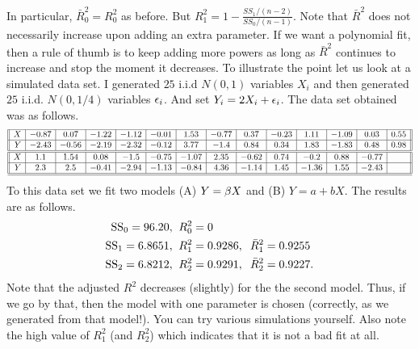 \documentclass[preprint,  11pt]{amsart}
\begin{document}
In particular, $\bar{R}_{0}^{2}=R_{0}^{2}$ as before. But $R_{1}^{2}=1-\frac{SS_{1}/(n-2)}{SS_{0}/(n-1)}$. Note that $\bar{R}^{2}$ does not necessarily increase upon adding an extra parameter. If we want a polynomial fit, then a rule of thumb is to keep adding more powers as long as $\bar{R}^{2}$ continues to increase and stop the moment it decreases.
\beg To illustrate the point let us look at a simulated data set. I generated $25$ i.i.d $N(0,1)$ variables $X_{i}$ and then generated $25$ i.i.d. $N(0,1/4)$ variables $\eps_{i}$. And set $Y_{i}=2X_{i}+\eps_{i}$. The  data set obtained was as follows.
\[
\begin{array}{||r|c|c|c|c|c|c|c|c|c|c|c|c|c||}
\hline
X  & -0.87&0.07&-1.22&-1.12&-0.01&1.53&-0.77&0.37&-0.23&1.11&-1.09&0.03&0.55 \\
\hline
Y  & -2.43&-0.56&-2.19&-2.32&-0.12&3.77&-1.4&0.84&0.34&1.83&-1.83&0.48&0.98 \\
\hline
\hline
X & 1.1&1.54&0.08&-1.5&-0.75&-1.07&2.35&-0.62&0.74&-0.2&0.88&-0.77 &\\
\hline
Y & 2.3&2.5&-0.41&-2.94&-1.13&-0.84&4.36&-1.14&1.45&-1.36&1.55&-2.43  &  \\
\hline
\hline
\end{array}
\]
To this data set we fit two models (A) $Y=\bet X$ and (B) $Y=a+bX$. The results are as follows.
\begin{align*}
\mb{SS}_{0}=96.20, &\;\;  R_{0}^{2}=0 \\
\mb{SS}_{1}=6.8651, &\;\;  R_{1}^{2}=0.9286, \hsp{2mm} \bar{R}_{1}^{2}=0.9255 \\
\mb{SS}_{2}= 6.8212, &\;\; R_{2}^{2}=0.9291, \hsp{2mm} \bar{R}_{2}^{2}=0.9227.
\end{align*}
Note that the adjusted $R^{2}$ decreases (slightly) for the the second model. Thus, if we go by that, then the model with one parameter is chosen (correctly, as we generated from that model!). You can try various simulations yourself. Also note the high value of $R_{1}^{2}$ (and $R_{2}^{2}$) which indicates that it is not a bad fit at all.
\eeg




\end{document}
